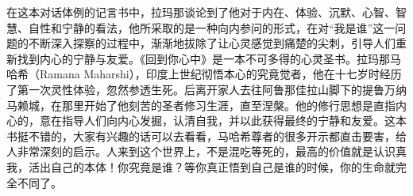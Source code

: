 \begin{book}
    在这本对话体例的记言书中，拉玛那谈论到了他对于内在、体验、沉默、心智、智慧、自性和宁静的看法，他所采取的是一种向内参问的形式，在对“我是谁”这一问题的不断深入探察的过程中，渐渐地拔除了让心灵感觉到痛楚的尖刺，引导人们重新找到内心的宁静与友爱。《回到你心中》是一本不可多得的心灵圣书。拉玛那马哈希（Ramana Maharshi），印度上世纪彻悟本心的究竟觉者，他在十七岁时经历了第一次灵性体验，忽然参透生死。后离开家人去往阿鲁那佳拉山脚下的提鲁万纳马赖城，在那里开始了他刻苦的圣者修习生涯，直至涅槃。他的修行思想是直指内心的，意在指导人们向内心发掘，认清自我，并以此获得最终的宁静和友爱。这本书挺不错的，大家有兴趣的话可以去看看，马哈希尊者的很多开示都直击要害，给人非常深刻的启示。人来到这个世界上，不是混吃等死的，最高的价值就是认识真我，活出自己的本体！你究竟是谁？等你真正悟到自己是谁的时候，你的生命就完全不同了。
\end{book}
